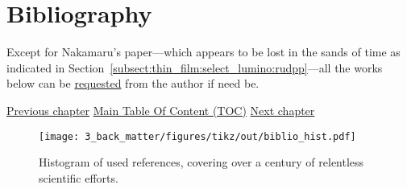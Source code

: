 \chapter{Bibliography}\label{chap:biblio}

\begin{tldrbox}
	Except for Nakamaru's paper\cite{nakamaru1979}---which appears to be lost in the sands of time as indicated in Section~\ref{subsect:thin_film:select_lumino:rudpp}---all the works below can be \href{mailto:emmanuel.dervieux@gmail.com}{requested} from the author if need be.
	
	\tcblower
	
	\hyperref[chap:conclusion]{Previous chapter} \hfill \hyperref[chapter:toc]{Main Table Of Content (TOC)} \hfill \hyperref[chap:add_ack]{Next chapter}
	
\end{tldrbox}

\begin{figure}
	\centering
	\texttt{[image: 3\_back\_matter/figures/tikz/out/biblio\_hist.pdf]}
	\caption[Histogram of used references.]{Histogram of used references, covering over a century of relentless scientific efforts.}
	\label{fig:biblio:biblio_hist}
\end{figure}

\printbibliography[heading=none]